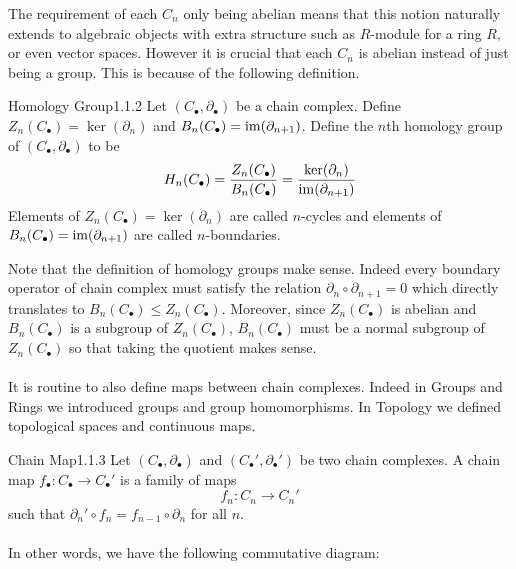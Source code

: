 \documentclass[a4paper]{article}
\begin{document}
The requirement of each $C_n$ only being abelian means that this notion naturally extends to algebraic objects with extra structure such as $R$-module for a ring $R$, or even vector spaces. However it is crucial that each $C_n$ is abelian instead of just being a group. This is because of the following definition. 

\begin{defn}{Homology Group}{1.1.2} Let $(C_\bullet,\partial_\bullet)$ be a chain complex. Define $Z_n(C_\bullet)=\ker(\partial_n)$ and $B_n(C_\bullet)=\operatorname{im}(\partial_{n+1})$. Define the $n$th homology group of $(C_\bullet,\partial_\bullet)$ to be $$H_n(C_\bullet)=\frac{Z_n(C_\bullet)}{B_n(C_\bullet)}=\frac{\ker(\partial_n)}{\operatorname{im}(\partial_{n+1})}$$
Elements of $Z_n(C_\bullet)=\ker(\partial_n)$ are called $n$-cycles and elements of $B_n(C_\bullet)=\operatorname{im}(\partial_{n+1})$ are called $n$-boundaries. 
\end{defn}

Note that the definition of homology groups make sense. Indeed every boundary operator of chain complex must satisfy the relation $\partial_n\circ\partial_{n+1}=0$ which directly translates to $B_n(C_\bullet)\leq Z_n(C_\bullet)$. Moreover, since $Z_n(C_\bullet)$ is abelian and $B_n(C_\bullet)$ is a subgroup of $Z_n(C_\bullet)$, $B_n(C_\bullet)$ must be a normal subgroup of $Z_n(C_\bullet)$ so that taking the quotient makes sense. \\~\\

It is routine to also define maps between chain complexes. Indeed in Groups and Rings we introduced groups and group homomorphisms. In Topology we defined topological spaces and continuous maps. 

\begin{defn}{Chain Map}{1.1.3} Let $(C_\bullet,\partial_\bullet)$ and $(C_\bullet',\partial_\bullet')$ be two chain complexes. A chain map $f_\bullet:C_\bullet\to C_\bullet'$ is a family of maps $$f_n:C_n\to C_n'$$ such that $\partial_n'\circ f_n=f_{n-1}\circ\partial_n$ for all $n$. \\~\\
In other words, we have the following commutative diagram: \\
\end{defn}
\end{document}
